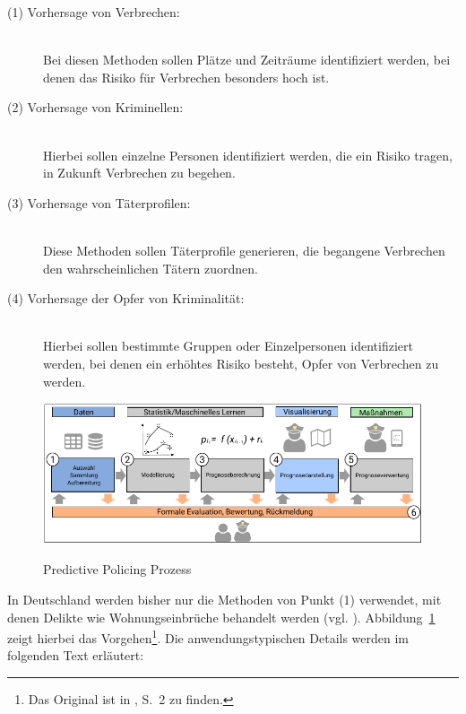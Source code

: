 \begin{description}

\item[(1) Vorhersage von Verbrechen:] \hfill \\
Bei diesen Methoden sollen Plätze und Zeiträume identifiziert werden,
bei denen das Risiko für Verbrechen besonders hoch ist.

\item[(2) Vorhersage von Kriminellen:] \hfill \\
Hierbei sollen einzelne Personen identifiziert werden, die ein Risiko
tragen, in Zukunft Verbrechen zu begehen.

\item[(3) Vorhersage von Täterprofilen:] \hfill \\
Diese Methoden sollen Täterprofile generieren, die begangene Verbrechen
den wahrscheinlichen Tätern zuordnen.

\item[(4) Vorhersage der Opfer von Kriminalität:] \hfill \\
Hierbei sollen bestimmte Gruppen oder Einzelpersonen identifiziert werden,
bei denen ein erhöhtes Risiko besteht, Opfer von Verbrechen zu werden.

\end{description} 

\begin{figure}%
\centering
\caption{Predictive Policing Prozess}
\includegraphics[scale=1.1]{Grafiken/Predictive_Policing_Ink.pdf} 
\label{pic:Predictive_Policing}
\end{figure}

In Deutschland werden bisher nur die Methoden von Punkt (1) verwendet, mit denen
Delikte wie Wohnungseinbrüche behandelt werden (vgl. \cite{Heuberger}).
Abbildung~\ref{pic:Predictive_Policing} zeigt hierbei das Vorgehen\footnote{
Das Original ist in \cite{Bode}, S.~2 zu finden.
}. Die anwendungstypischen Details werden
im folgenden Text erläutert:

